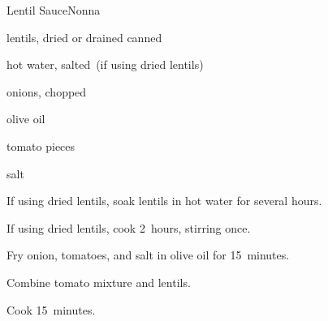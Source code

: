 \begin{recipe}{Lentil Sauce}{Nonna}{}

\begin{ingredients}
\item lentils, dried or drained canned
\item hot water, salted~(if using dried lentils)
\item onions, chopped
\item olive oil
\item tomato pieces
\item salt
\end{ingredients}

\begin{directions}
\item If using dried lentils, soak lentils in hot water for several hours.
\item If using dried lentils, cook 2~hours, stirring once.
\item Fry onion, tomatoes, and salt in olive oil for 15~minutes.
\item Combine tomato mixture and lentils.
\item Cook 15~minutes.
\end{directions}

\end{recipe}
